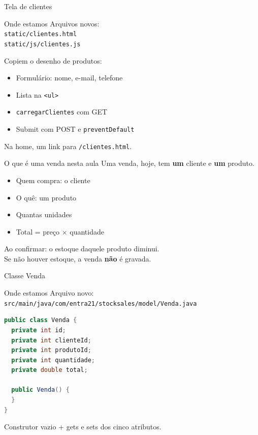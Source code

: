 \documentclass[aspectratio=169,11pt]{beamer}
\newcommand{\onde}[1]{%
  \begin{block}{Onde estamos}
    #1
  \end{block}
}
\begin{document}
\begin{frame}[fragile]{Tela de clientes}
  \onde{Arquivos novos:\\
        \texttt{static/clientes.html}\\
        \texttt{static/js/clientes.js}}

  Copiem o desenho de produtos:

  \vspace{0.3em}
  \begin{itemize}
    \item Formulário: nome, e-mail, telefone
    \item Lista na \texttt{<ul>}
    \item \texttt{carregarClientes} com GET
    \item Submit com POST e \texttt{preventDefault}
  \end{itemize}

  \vspace{0.4em}
  Na home, um link para \texttt{/clientes.html}.
\end{frame}

\begin{frame}{O que é uma venda nesta aula}
  Uma venda, hoje, tem \textbf{um} cliente e \textbf{um} produto.

  \vspace{0.5em}
  \begin{itemize}
    \item Quem compra: o cliente
    \item O quê: um produto
    \item Quantas unidades
    \item Total = preço $\times$ quantidade
  \end{itemize}

  \vspace{0.5em}
  Ao confirmar: o estoque daquele produto diminui.\\
  Se não houver estoque, a venda \textbf{não} é gravada.
\end{frame}

\begin{frame}[fragile]{Classe Venda}
  \onde{Arquivo novo:\\
        \texttt{src/main/java/com/entra21/stocksales/model/Venda.java}}

\begin{lstlisting}[language=Java,basicstyle=\ttfamily\footnotesize]
public class Venda {
  private int id;
  private int clienteId;
  private int produtoId;
  private int quantidade;
  private double total;

  public Venda() {
  }
}
\end{lstlisting}

  Construtor vazio + gets e sets dos cinco atributos.
\end{frame}
\end{document}
